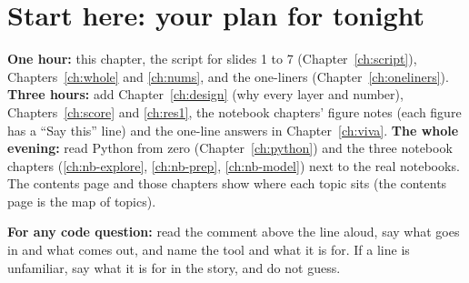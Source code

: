 \section{Start here: your plan for tonight}\label{ch:start}

\textbf{One hour:} this chapter, the script for slides 1 to 7 (Chapter~\ref{ch:script}), Chapters~\ref{ch:whole} and \ref{ch:nums}, and the one-liners (Chapter~\ref{ch:oneliners}). \textbf{Three hours:} add Chapter~\ref{ch:design} (why every layer and number), Chapters~\ref{ch:score} and \ref{ch:res1}, the notebook chapters' figure notes (each figure has a ``Say this'' line) and the one-line answers in Chapter~\ref{ch:viva}. \textbf{The whole evening:} read Python from zero (Chapter~\ref{ch:python}) and the three notebook chapters (\ref{ch:nb-explore}, \ref{ch:nb-prep}, \ref{ch:nb-model}) next to the real notebooks. The contents page and those chapters show where each topic sits (the contents page is the map of topics).\label{tab:where}

\textbf{For any code question:}\label{sec:method} read the comment above the line aloud, say what goes in and what comes out, and name the tool and what it is for. If a line is unfamiliar, say what it is for in the story, and do not guess.

